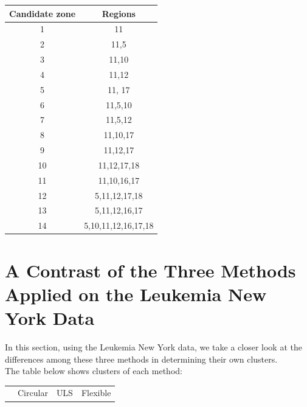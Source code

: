 \documentclass[12pt]{article}
\begin{document}
\begin{enumerate}
	
	\begin{tabular}{|c|c|}
		\hline
		Candidate zone & Regions  \\
		\hline
		1 & 11  \\
		2 & 11,5 \\
		3 & 11,10 \\
		4 & 11,12 \\
		5 & 11, 17 \\
		6 &  11,5,10 \\
		7 & 11,5,12 \\
		8 & 11,10,17 \\
		9 & 11,12,17 \\
		10 & 11,12,17,18 \\
		11 & 11,10,16,17 \\
		12 & 5,11,12,17,18 \\
		13 &  5,11,12,16,17 \\ 
		14 &   5,10,11,12,16,17,18 \\ 
	\hline
	\end{tabular}
	
	\section{A Contrast of the Three Methods Applied on the Leukemia New York Data}
	In this section, using the Leukemia New York data, we take a closer look at the differences among these three methods in determining their own clusters. \\
	The table below shows clusters of each method:\\
	
	\begin{tabular}{|c|c|c|c|}
	\hline
	& Circular & ULS & Flexible \\
	

\end{tabular}
\end{enumerate}
\end{document}
